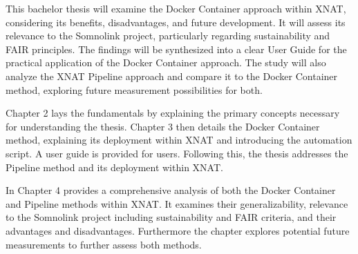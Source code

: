 This bachelor thesis will examine the Docker Container approach within XNAT, considering its benefits, disadvantages, and future development. It will assess its relevance to the Somnolink project, particularly regarding sustainability and FAIR principles. The findings will be synthesized into a clear User Guide for the practical application of the Docker Container approach.
The study will also analyze the XNAT Pipeline approach and compare it to the Docker Container method, exploring future measurement possibilities for both.

Chapter 2 lays the fundamentals by explaining the primary concepts necessary for understanding the thesis. Chapter 3 then details the Docker Container method, explaining its deployment within XNAT and introducing the automation script. A user guide is provided for users. Following this, the thesis addresses the Pipeline method and its deployment within XNAT.

In Chapter 4 provides a comprehensive analysis of both the Docker Container and Pipeline methods within XNAT. It examines their  generalizability, relevance to the Somnolink project including sustainability and FAIR criteria, and their advantages and disadvantages. Furthermore the chapter explores potential future measurements to further assess both methods.



 

